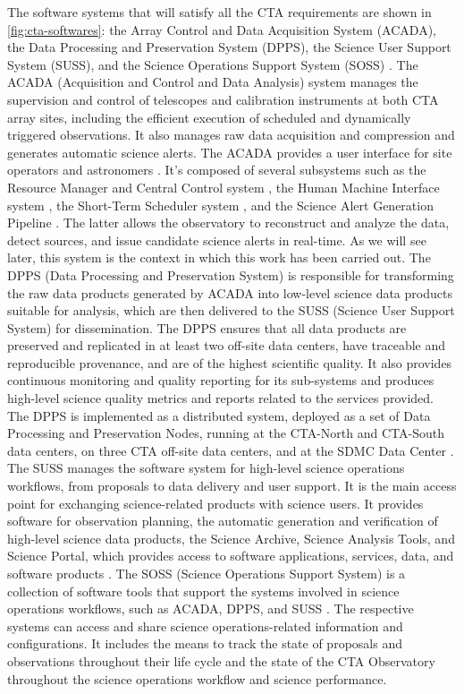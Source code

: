 The software systems that will satisfy all the CTA requirements are shown in \autoref{fig:cta-softwares}: the Array Control and Data Acquisition System (ACADA), the Data Processing and Preservation System (DPPS), the Science User Support System (SUSS), and the Science Operations Support System (SOSS) \cite{ctaobservatorywebsitetechnology}. 
The ACADA (Acquisition and Control and Data Analysis) system manages the supervision and control of telescopes and calibration instruments at both CTA array sites, including the efficient execution of scheduled and dynamically triggered observations. It also manages raw data acquisition and compression and generates automatic science alerts. The ACADA provides a user interface for site operators and astronomers \cite{Oya2017}. It's composed of several subsystems such as the Resource Manager and Central Control system \cite{Melkumyan2019}, the Human Machine Interface system \cite{Sadeh2017}, the Short-Term Scheduler system \cite{Colome2014}, and the Science Alert Generation Pipeline \cite{Bulgarelli2014}. The latter allows the observatory to reconstruct and analyze the data, detect sources, and issue candidate science alerts in real-time. As we will see later, this system is the context in which this work has been carried out. The DPPS (Data Processing and Preservation System) is responsible for transforming the raw data products generated by ACADA into low-level science data products suitable for analysis, which are then delivered to the SUSS (Science User Support System) for dissemination. The DPPS ensures that all data products are preserved and replicated in at least two off-site data centers, have traceable and reproducible provenance, and are of the highest scientific quality. It also provides continuous monitoring and quality reporting for its sub-systems and produces high-level science quality metrics and reports related to the services provided. The DPPS is implemented as a distributed system, deployed as a set of Data Processing and Preservation Nodes, running at the CTA-North and CTA-South data centers, on three CTA off-site data centers, and at the SDMC Data Center \cite{ctaobservatorywebsite}. The SUSS manages the software system for high-level science operations workflows, from proposals to data delivery and user support. It is the main access point for exchanging science-related products with science users. It provides software for observation planning, the automatic generation and verification of high-level science data products, the Science Archive, Science Analysis Tools, and Science Portal, which provides access to software applications, services, data, and software products \cite{Oya2017}. The SOSS (Science Operations Support System) is a collection of software tools that support the systems involved in science operations workflows, such as ACADA, DPPS, and SUSS \cite{ctaobservatorywebsite}. The respective systems can access and share science operations-related information and configurations. It includes the means to track the state of proposals and observations throughout their life cycle and the state of the CTA Observatory throughout the science operations workflow and science performance.


